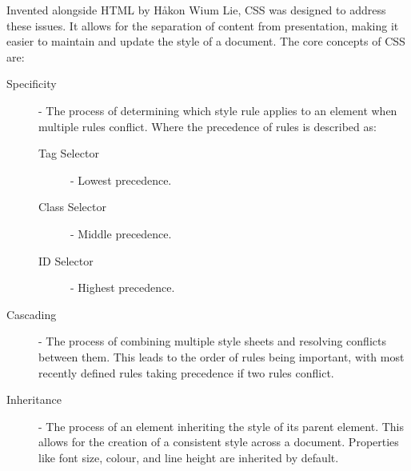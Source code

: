 \documentclass[12pt letter]{report}
\begin{document}
Invented alongside HTML by Håkon Wium Lie, CSS was designed to address these issues. It allows for the separation of
content from presentation, making it easier to maintain and update the style of a document. The core concepts of CSS are:
\begin{description}
  \item[Specificity] - The process of determining which style rule applies to an element when multiple rules conflict.
        Where the precedence of rules is described as:
        \begin{description}
          \item[Tag Selector] - Lowest precedence.
          \item[Class Selector] - Middle precedence.
          \item[ID Selector] - Highest precedence.
        \end{description}
  \item[Cascading] - The process of combining multiple style sheets and resolving conflicts between them. This leads to
        the order of rules being important, with most recently defined rules taking precedence if two rules conflict.
  \item[Inheritance] - The process of an element inheriting the style of its parent element. This allows for the
        creation of a consistent style across a document. Properties like font size, colour, and line height are inherited by default.
\end{description}
\end{document}
